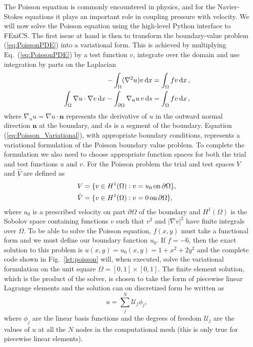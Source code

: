 \documentclass[final,3p,times,twocolumn]{elsarticle}
\newcounter{bla}
\begin{document}
The Poisson equation is commonly encountered in physics, and for the Navier-Stokes equations it plays an important role in coupling pressure with velocity. We will now solve the Poisson equation using the high-level Python interface to FEniCS. The first issue at hand is then to transform the boundary-value problem (\ref{eq:PoissonPDE}) into a variational form. This is achieved by multiplying Eq.~(\ref{eq:PoissonPDE}) by a test function $v$, integrate over the domain and use integration by parts on the Laplacian
\begin{align}
 -\int_\Omega (\nabla^2 u)v \, \mathrm{d}x &= \int_\Omega fv \, \mathrm{d}x\thinspace, \\
 \int_\Omega\nabla u\cdot\nabla v \, \mathrm{d}x - \int_{\partial\Omega} \nabla_n u\, v \, \mathrm{d}s   &=  \int_\Omega fv \, \mathrm{d}x\thinspace, \label{eq:Poisson_Variational}
\end{align}
where $\nabla_n u = \nabla u \cdot \bm{n}$ represents the derivative of $u$ in the outward normal direction $\bm{n}$ at the boundary, and $\mathrm{d}s$ is a segment of the boundary. Equation (\ref{eq:Poisson_Variational}), with appropriate boundary conditions, represents a variational formulation of the Poisson boundary value problem. To complete the formulation we also need to choose appropriate function spaces for both the trial and test functions $u$ and $v$. For the Poisson problem the trial and test spaces $V$ and $\hat{V}$ are defined as
\begin{align}
 V &= \{ v\in H^1(\Omega): v=u_0 \,\mathrm{ on }\, \partial \Omega \}, \notag \\
 \hat{V} &= \{ v\in H^1(\Omega): v=0\, \mathrm{ on }\, \partial \Omega \},
 \label{eq:H1-spaces}
\end{align}
where $u_0$ is a prescribed velocity on part $\partial \Omega$ of the boundary and $H^1(\Omega)$ is the Sobolov space containing functions $v$ such that $v^2$ and $|\nabla v|^2$ have finite integrals over $\Omega$. To be able to solve the Poisson equation, $f(x,y)$ must take a functional form and we must define our boundary function $u_0$. If $f = -6$, then the exact solution to this problem is $u(x,y) = u_0(x,y) = 1+x^2+2y^2$ and the complete code shown in Fig.~\ref{lst:poisson} will, when executed, solve the variational formulation on the unit square $\Omega=[0, 1]\times [0,1]$. The finite element solution, which is the product of the solver, is chosen to take the form of piecewise linear Lagrange elements and the solution can on discretized form be written as
\begin{equation}
 u = \sum_j^N \mathcal{U}_j \phi_j,
 \label{eq:u_function}
\end{equation}
where $\phi_j$ are the linear basis functions and the degrees of freedom $\mathcal{U}_j$ are the values of $u$ at all the $N$ nodes in the computational mesh (this is only true for piecewise linear elements).
\end{document}
